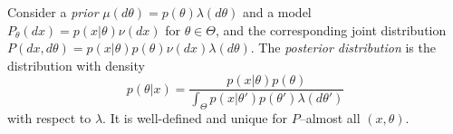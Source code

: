 
\begin{definition}
	\label{def:posterior-distribution}
	Consider a \emph{prior} $\mu(d \theta) = p(\theta) \lambda(d \theta)$ and a model $P_\theta(dx) = p(x | \theta) \nu(dx)$ for $\theta \in \Theta$, and the corresponding joint distribution $P(dx, d\theta) = p(x | \theta) p(\theta) \nu(dx) \lambda(d \theta)$.
	The \emph{posterior distribution} is the distribution with density
	\begin{equation*}
		p(\theta | x) = \frac{p(x | \theta) p(\theta)}{\int_\Theta p(x | \theta') p(\theta') \lambda(d \theta')}
	\end{equation*}
	with respect to $\lambda$. 
	It is well-defined and unique for $P$--almost all $(x, \theta)$.
\end{definition}

